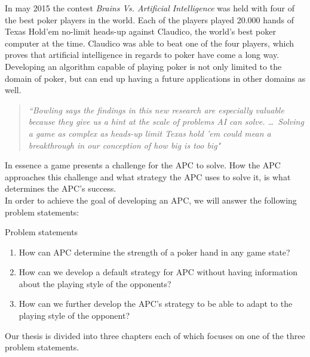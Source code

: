 In may 2015 the contest \textit{Brains Vs. Artificial Intelligence} \cite{brain-vs-ai} was held with four of the best poker players in the world. Each of the players played 20.000 hands of Texas Hold'em no-limit heads-up against Claudico, the world's best poker computer at the time. Claudico was able to beat one of the four players, which proves that artificial intelligence in regards to poker have come a long way.\\

Developing an algorithm capable of playing poker is not only limited to the domain of poker, but can end up having a future applications in other domains as well.

\begin{quotation}
\textit{``Bowling says the findings in this new research are especially valuable because they give us a hint at the scale of problems AI can solve. \ldots ~Solving a game as complex as heads-up limit Texas hold ’em could mean a breakthrough in our conception of how big is too big"} \cite{quote}
\end{quotation}

In essence a game presents a challenge for the APC to solve. How the APC approaches this challenge and what strategy the APC uses to solve it, is what determines the APC's success.\\

In order to achieve the goal of developing an APC, we will answer the following problem statements:

\vspace{4mm}
\begin{statementBox2}{Problem statements}
\begin{enumerate}
    \item \label{itm:q1} How can APC determine the strength of a poker hand in any game state? \label{itm:ps1}
    \item \label{itm:q2} How can we develop a default strategy for APC without having information about the playing style of the opponents? \label{itm:ps2}
    \item \label{itm:q3} How can we further develop the APC's strategy to be able to adapt to the playing style of the opponent? \label{itm:ps3}
  \end{enumerate}
\end{statementBox2}
\vspace{4mm}

Our thesis is divided into three chapters each of which focuses on one of the three problem statements.

